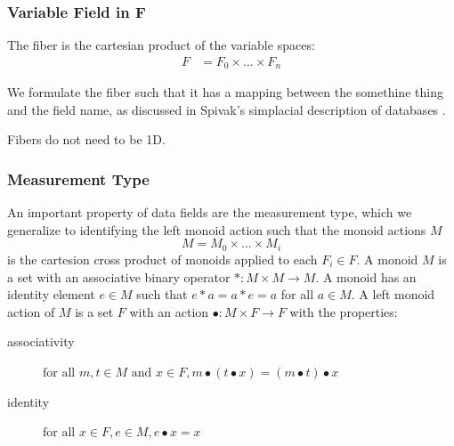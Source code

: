 \documentclass[../main.tex]{subfiles}
\begin{document}
\subsubsection{Variable Field in F }
\label{sec:fiber_data}



The fiber is the cartesian product of the variable spaces:
\begin{align}
F &= F_{0} \times \ldots \times F_{n}
\end{align}

We formulate the fiber such that it has a mapping between the somethine thing and the field name, as discussed in Spivak's simplacial description of databases \cite{spivakSIMPLICIALDATABASES,spivakDatabasesAreCategories2010}. 

Fibers do not need to be 1D.

\subsubsection{Measurement Type}
An important property of data fields are the measurement type, which we generalize to identifying the left monoid action such that the monoid actions $M$ 
\begin{equation}
M = M_{0} \times \ldots\times M_{i}
\end{equation}
is the cartesion cross product of monoids applied to each $F_{i}\in F$. A monoid \cite{Monoid2021} $M$ is a set with an associative binary operator $\ast:M \times M\rightarrow M$. A monoid has an identity element $e\in M$ such that $e\ast a= a \ast e = a$ for all $a \in M$. A left monoid action \cite{SemigroupAction2021,ActionNLab} of $M$ is a set $F$ with an action $\bullet: M\times F \rightarrow F$ with the properties:
\begin{description}
    \item[associativity] $\text{for all } m,t \in M \text{ and } x\in F, m\bullet(t\bullet x) = (m\bullet t) \bullet x$
    \item[identity] $\text{for all } x\in F, e\in M,  e\bullet x = x$ 
\end{description} 
\end{document}
